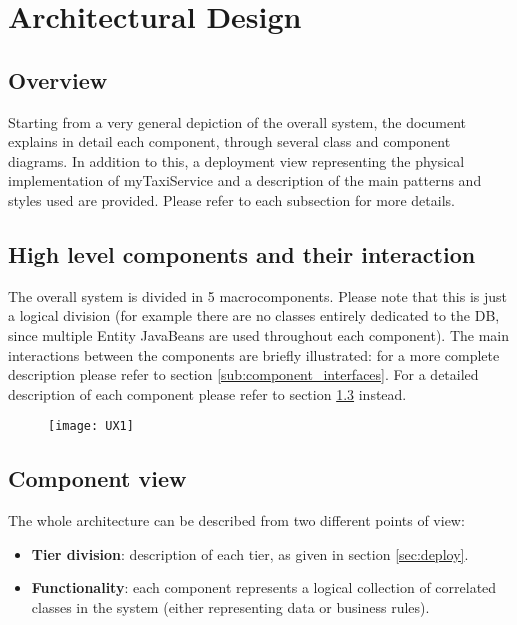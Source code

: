 \pagebreak
\section{Architectural Design}
 
\subsection{Overview}
Starting from a very general depiction of the overall system, the document explains in detail each component, through several class and component diagrams. In addition to this, a deployment view representing the physical implementation of myTaxiService and a description of the main patterns and styles used are provided. Please refer to each subsection for more details.

\newpage
\subsection{High level components and their interaction}
The overall system is divided in 5 macrocomponents. Please note that this is just a logical division (for example there are no classes entirely dedicated to the DB, since multiple Entity JavaBeans are used throughout each component). The main interactions between the components are briefly illustrated: for a more complete description please refer to section \ref{sub:component_interfaces}. For a detailed description of each component please refer to section \ref{sub:component_view} instead.

\begin{figure}[h!]
    \centering
    \texttt{[image: UX1]}
\end{figure}


\newpage
\subsection{Component view}
\label{sub:component_view}
The whole architecture can be described from two different points of view: 
\begin{itemize}
	\item \textbf{Tier division}: description of each tier, as given in section \ref{sec:deploy}.
	\item \textbf{Functionality}: each component represents a logical collection of correlated classes in the system (either representing data or business rules).
\end{itemize}


